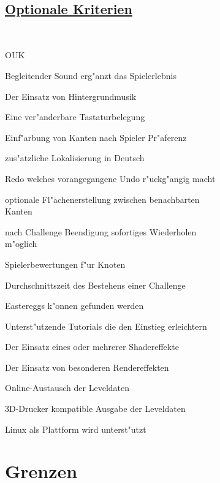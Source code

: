 ~\\


\subsection*{\underline{Optionale Kriterien}}

~\\

\begin{ids}{\gls{OUK}}


\id[10] Begleitender Sound erg{"a}nzt das Spielerlebnis

\id[20] Der Einsatz von Hintergrundmusik

\id[30] Eine ver{"a}nderbare Tastaturbelegung

\id[40] Einf{"a}rbung von Kanten nach Spieler Pr{"a}ferenz

\id[50] zus{"a}tzliche Lokalisierung in Deutsch

\id[60] Redo welches vorangegangene Undo r{"u}ckg{"a}ngig macht

\id[70] optionale Fl{"a}chenerstellung zwischen benachbarten \\Kanten

\id[80] nach Challenge Beendigung sofortiges Wiederholen\\ m{"o}glich

\id[90] Spielerbewertungen f{"u}r Knoten

\id[100] Durchschnittszeit des Bestehens einer Challenge

\id[110] Eastereggs k{"o}nnen gefunden werden

\id[120] Unterst{"u}tzende Tutorials die den Einstieg erleichtern
	
\id[130] Der Einsatz eines oder mehrerer Shadereffekte

\id[140] Der Einsatz von besonderen Rendereffekten 

\id[150] Online-Austausch der Leveldaten

\id[160] 3D-Drucker kompatible Ausgabe der Leveldaten

\id[170] Linux als Plattform wird unterst{"u}tzt

\end{ids}


%
%
\clearpage


\section{Grenzen}
\label{UF:Grenzen}

